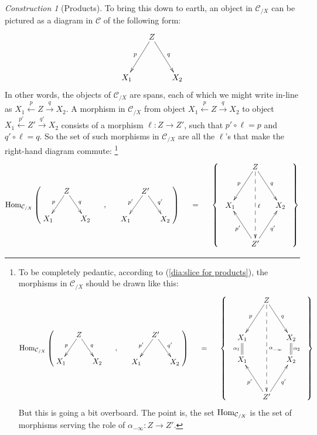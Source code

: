 \documentclass{book}
\def\tn{\textnormal}
\def\mc{\mathcal}
\def\Hom{\tn{Hom}}
\def\to{\rightarrow}
\def\taking{\colon}
\newcommand{\To}[1]{\xrightarrow{#1}}
\newcommand{\From}[1]{\xleftarrow{#1}}
\def\mcC{\mc{C}}
\theoremstyle{remark}
\newtheorem{construction}[subsubsection]{Construction}
\theoremstyle{definition}
\begin{document}
\begin{construction}[Products]
To bring this down to earth, an object in $\mcC_{/X}$ can be pictured as a diagram in $\mcC$ of the following form:
$$\xymatrix@=15pt{&Z\ar[ldd]_p\ar[rdd]^q\\\\X_1&&X_2}$$   
In other words, the objects of $\mcC_{/X}$ are spans, each of which we might write in-line as $X_1\From{p}Z\To{q}X_2$. A morphism in $\mcC_{/X}$ from object $X_1\From{p}Z\To{q}X_2$ to object $X_1\From{p'}Z'\To{q'}X_2$ consists of a morphism $\ell\taking Z\to Z'$, such that $p'\circ\ell=p$ and $q'\circ\ell=q$. So the set of such morphisms in $\mcC_{/X}$ are all the $\ell$'s that make the right-hand diagram commute:
\footnote{To be completely pedantic, according to (\ref{dia:slice for products}), the morphisms in $\mcC_{/X}$ should be drawn like this:
\begin{align*}
\Hom_{\mcC_{/X}}\normalsize\left(\parbox{1in}{\xymatrix@=8pt{&Z\ar[ldd]_p\ar[rdd]^q\\\\X_1&&X_2}}\hspace{.2in},\hspace{.2in}\parbox{1in}{\xymatrix@=8pt{&Z'\ar[ldd]_{p'}\ar[rdd]^{q'}\\\\X_1&&X_2}}\right)\hspace{.2in}=\hspace{.2in}\left\{\;\;\parbox{1in}{\xymatrix@=15pt{&Z\ar[ldd]_{p}\ar[rdd]^{q}\ar@{-->}[ddddd]^{\alpha^{}_{-\infty}}\\\\X_1\ar@{=}[d]_{\alpha_1}&&X_2\ar@{=}[d]^{\alpha_2}\\X_1&&X_2\\\\&Z'\ar[uul]^{p'}\ar[uur]_{q'}}}\;\;\right\}
\end{align*}
But this is going a bit overboard. The point is, the set $\Hom_{\mcC_{/X}}$ is the set of morphisms serving the role of $\alpha_{-\infty}\taking Z\to Z'$.}
\begin{align}\label{dia:morphism of spans}
\Hom_{\mcC_{/X}}\normalsize\left(\parbox{1in}{\xymatrix@=8pt{&Z\ar[ldd]_p\ar[rdd]^q\\\\X_1&&X_2}}\hspace{.2in},\hspace{.2in}\parbox{1in}{\xymatrix@=8pt{&Z'\ar[ldd]_{p'}\ar[rdd]^{q'}\\\\X_1&&X_2}}\right)\hspace{.2in}=\hspace{.2in}\left\{\;\;\parbox{1in}{\xymatrix@=15pt{&Z\ar[ldd]_{p}\ar[rdd]^{q}\ar@{-->}[dddd]^\ell\\\\X_1&&X_2\\\\&Z'\ar[uul]^{p'}\ar[uur]_{q'}}}\;\;\right\}
\end{align}


\end{construction}
\end{document}
